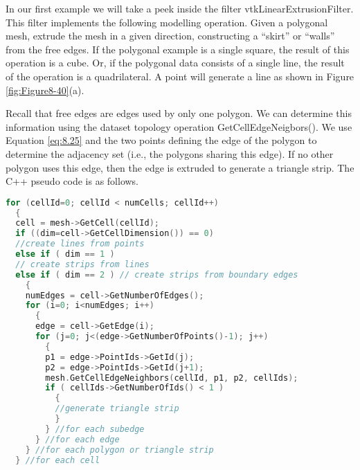In our first example we will take a peek inside the filter vtkLinearExtrusionFilter. This filter implements the following modelling operation. Given a polygonal mesh, extrude the mesh in a given direction, constructing a ``skirt'' or ``walls'' from the free edges. If the polygonal example is a single square, the result of this operation is a cube. Or, if the polygonal data consists of a single line, the result of the operation is a quadrilateral. A point will generate a line as shown in Figure \ref{fig:Figure8-40}(a).

Recall that free edges are edges used by only one polygon. We can determine this information using the dataset topology operation GetCellEdgeNeigbors(). We use Equation \ref{eq:8.25} and the two points defining the edge of the polygon to determine the adjacency set (i.e., the polygons sharing this edge). If no other polygon uses this edge, then the edge is extruded to generate a triangle strip. The C++ pseudo code is as follows.

\begin{lstlisting}[language=C++, caption={Determining free edges.}]
for (cellId=0; cellId < numCells; cellId++)
  {
  cell = mesh->GetCell(cellId);
  if ((dim=cell->GetCellDimension()) == 0)
  //create lines from points
  else if ( dim == 1 )
  // create strips from lines
  else if ( dim == 2 ) // create strips from boundary edges
    {
    numEdges = cell->GetNumberOfEdges();
    for (i=0; i<numEdges; i++)
      {
      edge = cell->GetEdge(i);
      for (j=0; j<(edge->GetNumberOfPoints()-1); j++)
        {
        p1 = edge->PointIds->GetId(j);
        p2 = edge->PointIds->GetId(j+1);
        mesh.GetCellEdgeNeighbors(cellId, p1, p2, cellIds);
        if ( cellIds->GetNumberOfIds() < 1 )
          {
          //generate triangle strip
          }
        } //for each subedge
      } //for each edge
    } //for each polygon or triangle strip
  } //for each cell
\end{lstlisting}

